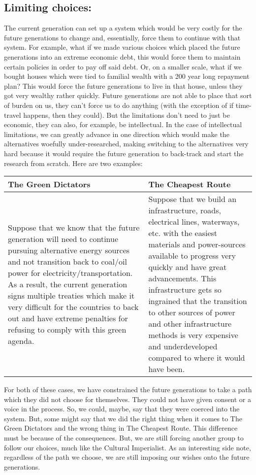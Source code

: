 \subsection{Limiting choices:}

The current generation can set up a system which would be very costly for the future generations to change and, essentially, force them to continue with that system. For example, what if we made various choices which placed the future generations into an extreme economic debt, this would force them to maintain certain policies in order to pay off said debt. Or, on a smaller scale, what if we bought houses which were tied to familial wealth with a 200 year long repayment plan? This would force the future generations to live in that house, unless they got very wealthy rather quickly. Future generations are not able to place that sort of burden on us, they can't force us to do anything (with the exception of if time-travel happens, then they could). But the limitations don't need to just be economic, they can also, for example, be intellectual. In the case of intellectual limitations, we can greatly advance in one direction which would make the alternatives woefully under-researched, making switching to the alternatives very hard because it would require the future generation to back-track and start the research from scratch. Here are two examples: 
\begin{tabular}{p{2in}|p{2in}}
The Green Dictators&The Cheapest Route\\\hline
Suppose that we know that the future generation will need to continue pursuing alternative energy sources and not transition back to coal/oil power for electricity/transportation. As a result, the current generation signs multiple treaties which make it very difficult for the countries to back out and have extreme penalties for refusing to comply with this green agenda.&Suppose that we build an infrastructure, roads, electrical lines, waterways, etc. with the easiest materials and power-sources available to progress very quickly and have great advancements. This infrastructure gets so ingrained that the transition to other sources of power and other infrastructure methods is very expensive and underdeveloped compared to where it would have been.\\
\end{tabular}

For both of these cases, we have constrained the future generations to take a path which they did not choose for themselves. They could not have given consent or a voice in the process. So, we could, maybe, say that they were coerced into the system. But, some might say that we did the right thing when it comes to The Green Dictators and the wrong thing in The Cheapest Route. This difference must be because of the consequences. But, we are still forcing another group to follow our choices, much like the Cultural Imperialist. As an interesting side note, regardless of the path we choose, we are still imposing our wishes onto the future generations.
